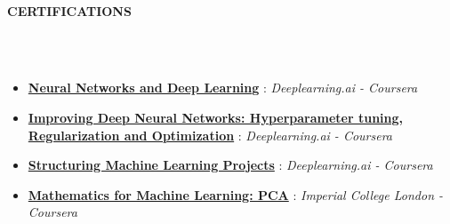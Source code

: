 \documentclass[letter,10pt]{book}
\newcommand{\lsep}{-0.5cm}
\newcommand{\psep}{-0.6cm}
\newcommand{\resheading}[1]{{\small \colorbox{mygrey}{\begin{minipage}{0.975\textwidth}{\textbf{#1 \vphantom{p\^{E}}}}\end{minipage}}}}
\begin{document}
\pagebreak

\hspace{0.5cm}\\[-0.2cm]
\resheading{\textbf{CERTIFICATIONS} }\\[\lsep]
\\[-0.5em]
\begin{itemize}
	\item \href{https://www.coursera.org/account/accomplishments/certificate/7BQGV7ZGYBHV}{\textbf{Neural Networks and Deep Learning}} : \textit{Deeplearning.ai - Coursera}\\[\psep]
	\item \href{https://www.coursera.org/account/accomplishments/certificate/Q9UDAMNJ4WJW}{\textbf{Improving Deep Neural Networks: Hyperparameter tuning, Regularization and Optimization}} : \textit{Deeplearning.ai - Coursera}\\[\psep]
	\item \href{https://www.coursera.org/account/accomplishments/certificate/XHD5MM85DNN8}{\textbf{Structuring Machine Learning Projects}} : \textit{Deeplearning.ai - Coursera}\\[\psep]
	\item \href{https://www.coursera.org/account/accomplishments/certificate/WJ6TRA83A89V}{\textbf{Mathematics for Machine Learning: PCA}} : \textit{Imperial College London - Coursera}
\end{itemize}
\end{document}
